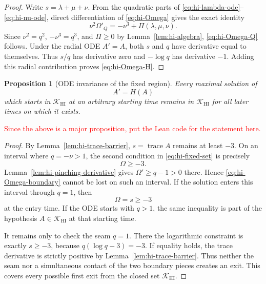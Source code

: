 \documentclass[10pt]{coll-l}
\newcommand{\trace}{\operatorname{trace}}
\newtheorem{proposition}[theorem]{Proposition}
\theoremstyle{definition}
\theoremstyle{remark}
\numberwithin{section}{chapter}
\numberwithin{equation}{chapter}
\begin{document}
\begin{proof}
Write $s=\lambda+\mu+\nu$.  From the quadratic parts of
\eqref{eq:hi-lambda-ode}--\eqref{eq:hi-nu-ode}, direct differentiation of
\eqref{eq:hi-Omega} gives the exact identity
\begin{equation}
 \nu^2\Omega'_Q
    =-\nu^3+\Pi(\lambda,\mu,\nu).                          \label{eq:hi-Omega-exact}
\end{equation}
Since $\nu^2=q^2$, $-\nu^3=q^3$, and
$\Pi\geq0$ by Lemma~\ref{lem:hi-algebra},
\eqref{eq:hi-Omega-Q} follows.  Under the radial ODE $A'=A$, both $s$ and
$q$ have derivative equal to themselves.  Thus $s/q$ has derivative zero
and $-\log q$ has derivative $-1$.  Adding this radial contribution proves
\eqref{eq:hi-Omega-H}.
\end{proof}

\begin{proposition}[ODE invariance of the fixed region]
\label{prop:hi-fixed-region-ode}
Every maximal solution of
\[
                         A'=H(A)
\]
which starts in $\mathcal K_{\mathrm{HI}}$ at an arbitrary starting time
remains in $\mathcal K_{\mathrm{HI}}$ for all later times on which it
exists.
\end{proposition}

\textcolor{red}{Since the above is a major proposition, put the Lean code for the statement here.}

\begin{proof}
By Lemma~\ref{lem:hi-trace-barrier}, $s=\trace A$ remains at least $-3$.
On an interval where $q=-\nu>1$, the second condition in
\eqref{eq:hi-fixed-set} is precisely
\begin{equation}
                         \Omega\geq-3.                     \label{eq:hi-Omega-boundary}
\end{equation}
Lemma~\ref{lem:hi-pinching-derivative} gives
$\Omega'\geq q-1>0$ there.  Hence \eqref{eq:hi-Omega-boundary} cannot be
lost on such an interval.  If the solution enters this interval through
$q=1$, then
\[
                  \Omega=s\geq-3
\]
at the entry time.  If the ODE starts with $q>1$, the same inequality is
part of the hypothesis $A\in\mathcal K_{\mathrm{HI}}$ at that starting
time.

It remains only to check the seam $q=1$.  There the logarithmic constraint
is exactly $s\geq-3$, because
$q(\log q-3)=-3$.  If equality holds, the trace derivative is strictly
positive by Lemma~\ref{lem:hi-trace-barrier}.  Thus neither the seam nor a
simultaneous contact of the two boundary pieces creates an exit.  This
covers every possible first exit from the closed set
$\mathcal K_{\mathrm{HI}}$.
\end{proof}
\end{document}
